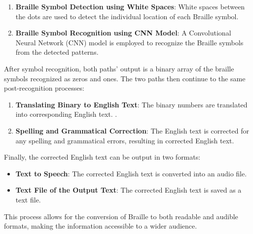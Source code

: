 \begin{enumerate}
    \item \textbf{Braille Symbol Detection using White Spaces}: White spaces between the dots are used to detect the individual location of each Braille symbol.
    \item \textbf{Braille Symbol Recognition using CNN Model}: A Convolutional Neural Network (CNN) model is employed to recognize the Braille symbols from the detected patterns.\\
\end{enumerate}


After symbol recognition, both paths' output is a binary array of the braille symbols recognized as zeros and ones. The two paths then continue to the same post-recognition processes:

\begin{enumerate}

    \item \textbf{Translating Binary to English Text}: The binary numbers are translated into corresponding English text.
.
    \item \textbf{Spelling and Grammatical Correction}: The English text is corrected for any spelling and grammatical errors, resulting in corrected English text.
\end{enumerate}
Finally, the corrected English text can be output in two formats:

\begin{itemize}
    \item \textbf{Text to Speech}: The corrected English text is converted into an audio file.
    \item \textbf{Text File of the Output Text}: The corrected English text is saved as a text file.
\end{itemize}
This process allows for the conversion of Braille to both readable and audible formats, making the information accessible to a wider audience.

 
